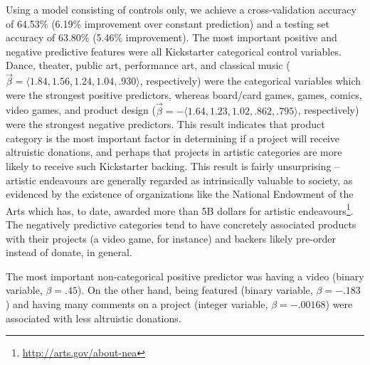 \documentclass[letterpaper]{article}
\begin{document}
Using a model consisting of controls only, we achieve a cross-validation accuracy of 64.53\% (6.19\% improvement over constant prediction) and a testing set accuracy of 63.80\% (5.46\% improvement). The most important positive and negative predictive features were all Kickstarter categorical control variables. Dance, theater, public art, performance art, and classical music ($\vec{\beta} = \langle 1.84, 1.56, 1.24, 1.04, .930 \rangle$, respectively) were the categorical variables which were the strongest positive predictors, whereas board/card games, games, comics, video games, and product design ($\vec{\beta} = -\langle 1.64, 1.23, 1.02, .862, .795 \rangle$, respectively) were the strongest negative predictors. This result indicates that product category is the most important factor in determining if a project will receive altruistic donations, and perhaps that projects in artistic categories are more likely to receive such Kickstarter backing. This result is fairly unsurprising -- artistic endeavours are generally regarded as intrinsically valuable to society, as evidenced by the existence of organizations like the National Endowment of the Arts which has, to date, awarded more than 5B dollars for artistic endeavours\footnote{\url{http://arts.gov/about-nea}}. The negatively predictive categories tend to have concretely associated products with their projects (a video game, for instance) and backers likely pre-order instead of donate, in general.

The most important non-categorical positive predictor was having a video (binary variable, $\beta = .45$). On the other hand, being featured (binary variable, $\beta = -.183$) and having many comments on a project (integer variable, $\beta = -.00168$) were associated with less altruistic donations.
\end{document}
